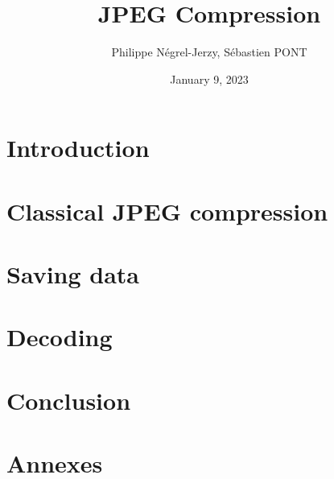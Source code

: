 \documentclass{sebaClass}
\title{JPEG Compression}
\author{Philippe Négrel-Jerzy, Sébastien PONT}
\date{January 9, 2023}
\begin{document}
\maketitle
\tableofcontents

\newpage

\section{Introduction}


\section{Classical JPEG compression}


\section{Saving data}


\section{Decoding}


\section{Conclusion}


\newpage

\section{Annexes}

\end{document}
